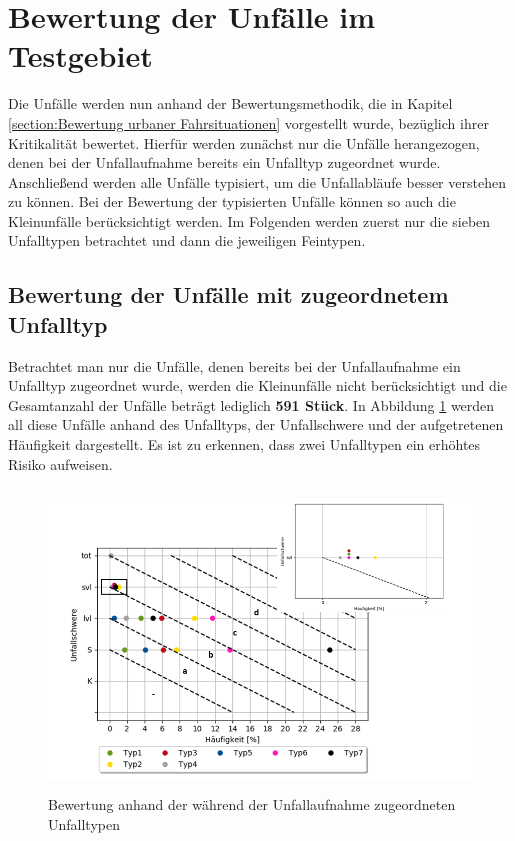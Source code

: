 
\section{Bewertung der Unfälle im Testgebiet}\label{section:Bewertung der Unfälle im Testgebiet}
Die Unfälle werden nun anhand der Bewertungsmethodik, die in Kapitel \ref{section:Bewertung urbaner Fahrsituationen} vorgestellt wurde, bezüglich ihrer Kritikalität bewertet. Hierfür werden zunächst nur die Unfälle herangezogen, denen bei der Unfallaufnahme bereits ein Unfalltyp zugeordnet wurde. Anschließend werden alle Unfälle typisiert, um die Unfallabläufe besser verstehen zu können. Bei der Bewertung der typisierten Unfälle können so auch die Kleinunfälle berücksichtigt werden. Im Folgenden werden zuerst nur die sieben Unfalltypen betrachtet und dann die jeweiligen Feintypen.

\subsection{Bewertung der Unfälle mit zugeordnetem Unfalltyp}
Betrachtet man nur die Unfälle, denen bereits bei der Unfallaufnahme ein Unfalltyp zugeordnet wurde, werden die Kleinunfälle nicht berücksichtigt und die Gesamtanzahl der Unfälle beträgt lediglich \textbf{591 Stück}. In Abbildung \ref{fig:Bewertung_UT} werden all diese Unfälle anhand des Unfalltyps, der Unfallschwere und der aufgetretenen Häufigkeit dargestellt. Es ist zu erkennen, dass zwei Unfalltypen ein erhöhtes Risiko aufweisen.

\begin{savenotes}
	\begin{figure}[H]
		\centering
		\includegraphics[width=12cm,height=8cm]{figures/Bewertung_UT}
		\caption[Bewertung anhand der während der Unfallaufnahme zugeordneten Unfalltypen]{Bewertung anhand der während der Unfallaufnahme zugeordneten Unfalltypen}\label{fig:Bewertung_UT}
	\end{figure}
\end{savenotes}

